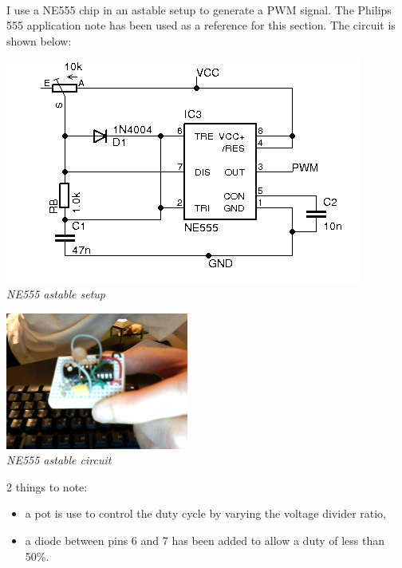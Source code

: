 \documentclass[12pt]{article}
\begin{document}
\paragraph{} I use a NE555 chip in an astable setup to generate a PWM signal. The Philips 555
application note has been used as a reference for this section. The circuit is shown below:
\begin{center}
  \includegraphics[keepaspectratio=true, width=1.\textwidth]{../pics/ne555_astable.png}
  \\
  \smallskip
  \tiny{\textit{NE555 astable setup}}
\end{center}

\begin{center}
  \includegraphics[keepaspectratio=true, width=60mm]{../pics/ne555_astable_circuit.png}
  \\
  \smallskip
  \tiny{\textit{NE555 astable circuit}}
\end{center}

2 things to note:
\begin{itemize}
\item a pot is use to control the duty cycle by varying the voltage divider ratio,
\item a diode between pins 6 and 7 has been added to allow a duty of less than 50\%.
\end{itemize}
\end{document}
